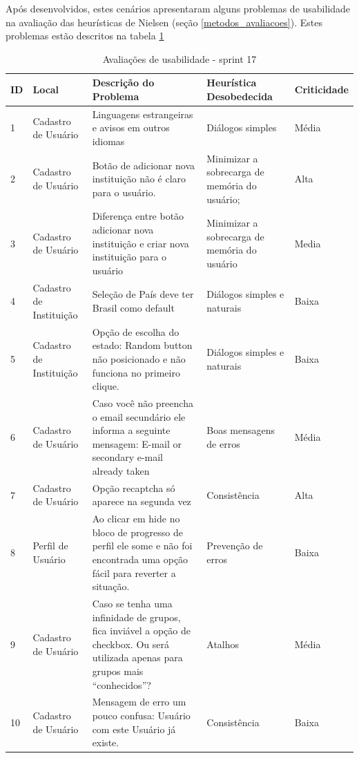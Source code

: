 Após desenvolvidos, estes cenários apresentaram alguns problemas de usabilidade na avaliação das heurísticas de Nielsen (seção \ref{metodos_avaliacoes}). Estes problemas estão descritos na tabela \ref{tabela_1a}

\begin{table}[h!]
\label{tabela_1a}
\begin{tabular}{|l|p{3cm}|p{6cm}|p{3cm}|l|}
\hline
\textbf{ID} & \textbf{Local} & \textbf{Descrição do Problema}                                                                                     & \textbf{Heurística Desobedecida} & \textbf{Criticidade} \\ \hline
1           & Cadastro de Usuário                 & Linguagens estrangeiras e avisos em outros idiomas & Diálogos simples  & Média                \\ \hline
2           & Cadastro de Usuário      & Botão de adicionar nova instituição não é claro para o usuário.  & Minimizar a sobrecarga de memória do usuário;           & Alta                \\ \hline
3           & Cadastro de Usuário               & Diferença entre botão adicionar nova instituição e criar nova instituição para o usuário  & Minimizar a sobrecarga de memória do usuário & Media                \\ \hline
4           & Cadastro de Instituição             & Seleção de País deve ter Brasil como default  & Diálogos simples e naturais    & Baixa                \\ \hline
5           & Cadastro de Instituição      & Opção de escolha do estado: Random button não posicionado e não funciona no primeiro clique. & Diálogos simples e naturais  & Baixa                \\ \hline
6           & Cadastro de Usuário  & Caso você não preencha o email secundário ele informa a seguinte mensagem: E-mail or secondary e-mail already taken & Boas mensagens de erros                & Média                \\ \hline
7           & Cadastro de Usuário  & Opção recaptcha só aparece na segunda vez & Consistência                     & Alta                \\ \hline
8           & Perfil de Usuário  & Ao clicar em hide no bloco de progresso de perfil ele some e não foi encontrada uma opção fácil para reverter a situação.
 & Prevenção de erros                     & Baixa                \\ \hline
9           & Cadastro de Usuário  & Caso se tenha uma infinidade de grupos, fica inviável a opção de checkbox. Ou será utilizada apenas para grupos mais ``conhecidos''? & Atalhos & Média                \\ \hline
10           & Cadastro de Usuário  & Mensagem de erro um pouco confusa: Usuário com este Usuário já existe.  & Consistência                     & Baixa                \\ \hline
\end{tabular}
\caption{Avaliações de usabilidade - sprint 17}
\end{table}

